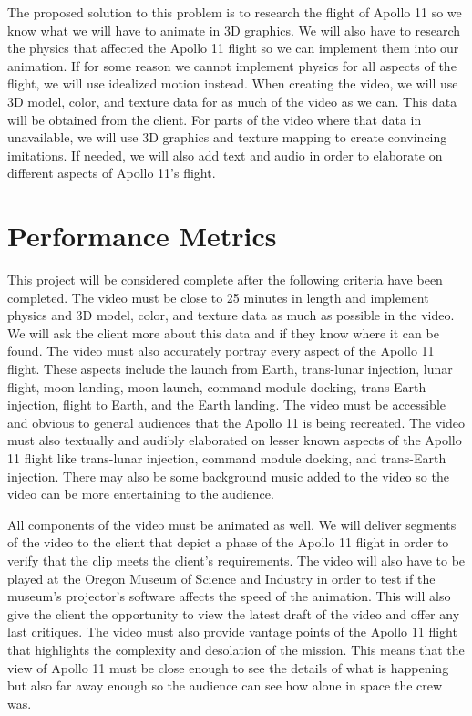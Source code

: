 \documentclass[journal,10pt,onecolumn,draftclsnofoot,]{IEEEtran}
\begin{document}
The proposed solution to this problem is to research the flight of Apollo 11 so we know what we will have to animate in 3D graphics. We will also have to research the physics that affected the Apollo 11 flight so we can implement them into our animation. If for some reason we cannot implement physics for all aspects of the flight, we will use idealized motion instead. When creating the video, we will use 3D model, color, and texture data for as much of the video as we can. This data will be obtained from the client. For parts of the video where that data in unavailable, we will use 3D graphics and texture mapping to create convincing imitations. If needed, we will also add text and audio in order to elaborate on different aspects of Apollo 11's flight.

\section{Performance Metrics}
This project will be considered complete after the following criteria have been completed. The video must be close to 25 minutes in length and implement physics and 3D model, color, and texture data as much as possible in the video. We will ask the client more about this data and if they know where it can be found. The video must also accurately portray every aspect of the Apollo 11 flight. These aspects include the launch from Earth, trans-lunar injection, lunar flight, moon landing, moon launch, command module docking, trans-Earth injection, flight to Earth, and the Earth landing. The video must be accessible and obvious to general audiences that the Apollo 11 is being recreated. The video must also textually and audibly elaborated on lesser known aspects of the Apollo 11 flight like trans-lunar injection, command module docking, and trans-Earth injection. There may also be some background music added to the video so the video can be more entertaining to the audience.

All components of the video must be animated as well. We will deliver segments of the video to the client that depict a phase of the Apollo 11 flight in order to verify that the clip meets the client's requirements. The video will also have to be played at the Oregon Museum of Science and Industry in order to test if the museum's projector's software affects the speed of the animation. This will also give the client the opportunity to view the latest draft of the video and offer any last critiques. The video must also provide vantage points of the Apollo 11 flight that highlights the complexity and desolation of the mission. This means that the view of Apollo 11 must be close enough to see the details of what is happening but also far away enough so the audience can see how alone in space the crew was.
\end{document}
